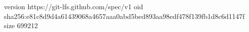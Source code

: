 version https://git-lfs.github.com/spec/v1
oid sha256:e81c8d9d4a61439068a4657aaa0abd5bed893aa98edf478f139fb1d8c6d1147f
size 699212
